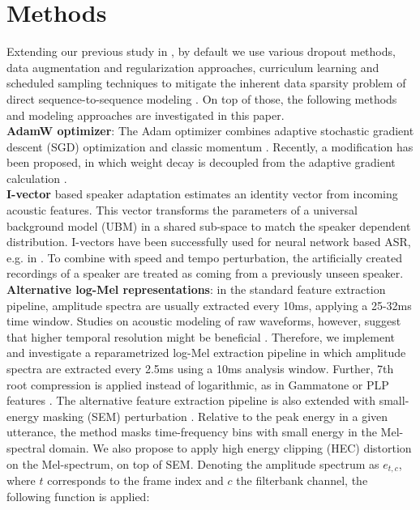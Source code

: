\documentclass[a4paper]{article}
\begin{document}
\vspace{-1mm}
\section{Methods}
\vspace{-.0mm}
\label{sec:meth}
Extending our previous study in \cite{Tuske2020}, by default we use various dropout methods, data augmentation and regularization approaches, curriculum learning and scheduled sampling techniques 
to mitigate the inherent data sparsity problem of direct sequence-to-sequence modeling \cite{hinton2012,pmlr-v28-wan13,
Kanda2013,Ko15,Saon2019,Park2019,
Murray1994,Krueger2017,Szegedy2016,Krogh1992,
Bengio2009,Bengio2015,Amodei2016}.
On top of those, the following methods and modeling approaches are investigated in this paper.
\\ {\bf AdamW optimizer}:
The Adam optimizer combines adaptive stochastic gradient descent (SGD) optimization and classic momentum \cite{kingma2014adam}.
Recently, a modification has been proposed, in which weight decay is decoupled from the adaptive gradient calculation \cite{loshchilov2018decoupled}.
\\ {\bf I-vector} based speaker adaptation estimates an identity vector from incoming acoustic features.
This vector transforms the parameters of a universal background model (UBM) in a shared sub-space to match the speaker dependent distribution.
I-vectors have been successfully used for neural network based ASR, e.g. in \cite{saon13,Kitza2019,saon21}.
To combine with speed and tempo perturbation, the artificially created recordings of a speaker are treated as coming from a previously unseen speaker.
\\ {\bf Alternative log-Mel representations}:
in the standard feature extraction pipeline, amplitude spectra are usually extracted every 10ms, applying a 25-32ms time window.
Studies on acoustic modeling of raw waveforms, however, suggest that higher temporal resolution might be beneficial \cite{Zhu2016,tuske2018:waveform}.
Therefore, we implement and investigate a reparametrized log-Mel extraction pipeline in which
amplitude spectra are extracted every 2.5ms using a 10ms analysis window.
Further, 7th root compression is applied instead of logarithmic, as in Gammatone or PLP features \cite{Hermansky1990,schlueter07}.
The alternative feature extraction pipeline is also extended with small-energy masking (SEM) perturbation \cite{Kim2020}.
Relative to the peak energy in a given utterance, the method masks time-frequency bins with small energy in the Mel-spectral domain.
We also propose to apply high energy clipping (HEC) distortion on the Mel-spectrum, on top of SEM.
Denoting the amplitude spectrum as $e_{t,c}$, where $t$ corresponds to the frame index and $c$ the filterbank channel, the following function is applied:
\end{document}

